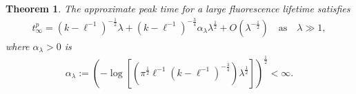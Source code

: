 \documentclass[10pt]{article}
\newtheorem{theorem}{Theorem}[section]
\numberwithin{equation}{section}
\numberwithin{figure}{section}
\begin{document}
\begin{theorem}\label{thm_linfty}
The approximate peak time for a large fluorescence lifetime satisfies
\begin{equation}\label{asympofpeak2}
\begin{split}
t^{p}_\infty = (k-\ell^{-1})^{-\frac{1}{2}} \lambda + (k-\ell^{-1})^{-\frac{3}{4}} \alpha_\lambda \lambda^\frac{1}{2} 
+ O\left( \lambda^{-\frac{1}{2}} \right) \quad \mbox{as} \quad \lambda \gg 1, 
\end{split}
\end{equation}
where $\alpha_\lambda>0$ is
\begin{equation}\label{defalpha}
\begin{split}
\alpha_\lambda := \left(-\log\left[ (\pi^{\frac{1}{2}} \ell^{-1} (k-\ell^{-1})^{-\frac{3}{4}}) \lambda^\frac{1}{2} \right] \right)^\frac{1}{2} < \infty.
\end{split}
\end{equation}
\end{theorem}
\end{document}
